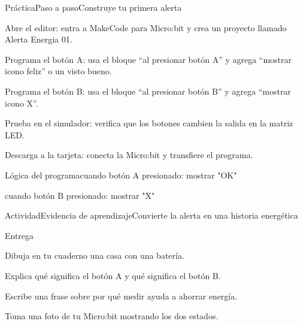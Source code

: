 \documentclass{../plantilla/hvtbook}
\begin{document}
\begin{HVTPage}{Práctica}{Paso a paso}{Construye tu primera alerta}
\begin{HVTSteps}\item Abre el editor: entra a MakeCode para Micro:bit y crea un proyecto llamado Alerta Energia 01. \item Programa el botón A: usa el bloque “al presionar botón A” y agrega “mostrar icono feliz” o un visto bueno. \item Programa el botón B: usa el bloque “al presionar botón B” y agrega “mostrar icono X”. \item Prueba en el simulador: verifica que los botones cambien la salida en la matriz LED. \item Descarga a la tarjeta: conecta la Micro:bit y transfiere el programa.\end{HVTSteps}
\begin{HVTCode}{Lógica del programa}cuando botón A presionado:
    mostrar "OK"

cuando botón B presionado:
    mostrar "X"\end{HVTCode}
\end{HVTPage}
\begin{HVTPage}{Actividad}{Evidencia de aprendizaje}{Convierte la alerta en una historia energética}
\begin{HVTTask}{Entrega}\item Dibuja en tu cuaderno una casa con una batería. \item Explica qué significa el botón A y qué significa el botón B. \item Escribe una frase sobre por qué medir ayuda a ahorrar energía. \item Toma una foto de tu Micro:bit mostrando los dos estados.\end{HVTTask}
\end{HVTPage}
\end{document}
